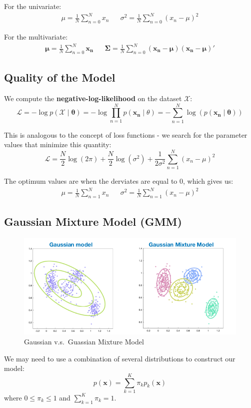 \documentclass[11pt]{article}
\begin{document}
For the univariate:
\begin{align*}
  \mu = \frac{1}{N} \sum_{n = 0}^N x_n && \sigma^2 = \frac{1}{N} \sum_{n=0}^N (x_n - \mu)^2
\end{align*}

For the multivariate:
\begin{align*}
  \bm{\mu} = \frac{1}{N} \sum_{n = 0}^N \bm{x_n} && \bm{\Sigma} = \frac{1}{N} \sum_{n=0}^N (\bm{x_n} - \bm{\mu})(\bm{x_n} - \bm{\mu})'
\end{align*}

\subsection{Quality of the Model}
We compute the \textbf{negative-log-likelihood} on the dataset $\mathcal{X}$:
\[
  \mathcal{L} = - \log p(\bm{\mathcal{X}} \mid \bm{\theta}) = - \log \prod_{n = 1}^N p(\bm{x_n} \mid \theta) = - \sum_{n = 1}^N \log(p(\bm{x_n} \mid \bm{\theta})) 
\]

This is analogous to the concept of loss functions - we search for the parameter values that minimize this quantity:
\[
  \mathcal{L} = \frac{N}{2} \log(2 \pi) + \frac{N}{2} \log(\sigma^2) + \frac{1}{2\sigma^2} \sum_{n = 1}^N (x_n - \mu)^2 
\]

The optimum values are when the derviates are equal to $0$, which gives us:
\begin{align*}
  \mu = \frac{1}{N} \sum_{n = 1}^N x_n && \sigma^2 = \frac{1}{N} \sum_{n = 1}^N (x_n - \mu)^2
\end{align*}

\subsection{Gaussian Mixture Model (GMM)}
\begin{figure}[htb!]
  \centering
  \caption{Gaussian v.s.\ Guassian Mixture Model}
  \includegraphics[scale=0.5]{mixture}
\end{figure}
We may need to use a combination of several distributions to construct our model:
\[
  p(\bm{x}) = \sum_{k = 1}^K \pi_k p_k (\bm{x}) 
\]
where $0 \leq \pi_k \leq 1$ and $\sum_{k = 1}^K \pi_k = 1$.
\end{document}
